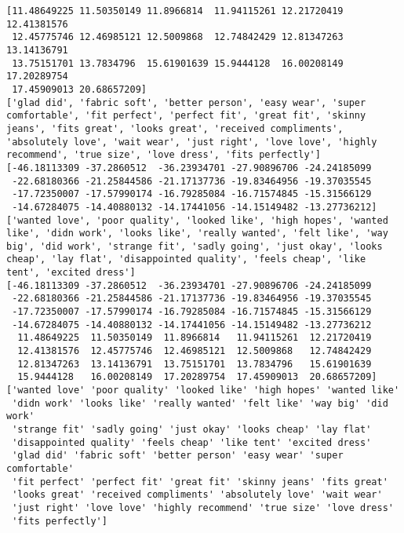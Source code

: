 \documentclass[11pt]{article}
\begin{document}
    \begin{Verbatim}[commandchars=\\\{\}]
[11.48649225 11.50350149 11.8966814  11.94115261 12.21720419 12.41381576
 12.45775746 12.46985121 12.5009868  12.74842429 12.81347263 13.14136791
 13.75151701 13.7834796  15.61901639 15.9444128  16.00208149 17.20289754
 17.45909013 20.68657209]
['glad did', 'fabric soft', 'better person', 'easy wear', 'super comfortable', 'fit perfect', 'perfect fit', 'great fit', 'skinny jeans', 'fits great', 'looks great', 'received compliments', 'absolutely love', 'wait wear', 'just right', 'love love', 'highly recommend', 'true size', 'love dress', 'fits perfectly']
[-46.18113309 -37.2860512  -36.23934701 -27.90896706 -24.24185099
 -22.68180366 -21.25844586 -21.17137736 -19.83464956 -19.37035545
 -17.72350007 -17.57990174 -16.79285084 -16.71574845 -15.31566129
 -14.67284075 -14.40880132 -14.17441056 -14.15149482 -13.27736212]
['wanted love', 'poor quality', 'looked like', 'high hopes', 'wanted like', 'didn work', 'looks like', 'really wanted', 'felt like', 'way big', 'did work', 'strange fit', 'sadly going', 'just okay', 'looks cheap', 'lay flat', 'disappointed quality', 'feels cheap', 'like tent', 'excited dress']
[-46.18113309 -37.2860512  -36.23934701 -27.90896706 -24.24185099
 -22.68180366 -21.25844586 -21.17137736 -19.83464956 -19.37035545
 -17.72350007 -17.57990174 -16.79285084 -16.71574845 -15.31566129
 -14.67284075 -14.40880132 -14.17441056 -14.15149482 -13.27736212
  11.48649225  11.50350149  11.8966814   11.94115261  12.21720419
  12.41381576  12.45775746  12.46985121  12.5009868   12.74842429
  12.81347263  13.14136791  13.75151701  13.7834796   15.61901639
  15.9444128   16.00208149  17.20289754  17.45909013  20.68657209]
['wanted love' 'poor quality' 'looked like' 'high hopes' 'wanted like'
 'didn work' 'looks like' 'really wanted' 'felt like' 'way big' 'did work'
 'strange fit' 'sadly going' 'just okay' 'looks cheap' 'lay flat'
 'disappointed quality' 'feels cheap' 'like tent' 'excited dress'
 'glad did' 'fabric soft' 'better person' 'easy wear' 'super comfortable'
 'fit perfect' 'perfect fit' 'great fit' 'skinny jeans' 'fits great'
 'looks great' 'received compliments' 'absolutely love' 'wait wear'
 'just right' 'love love' 'highly recommend' 'true size' 'love dress'
 'fits perfectly']

    \end{Verbatim}

    \begin{center}
    \end{center}
    { \hspace*{\fill} \\}
    
\end{document}
